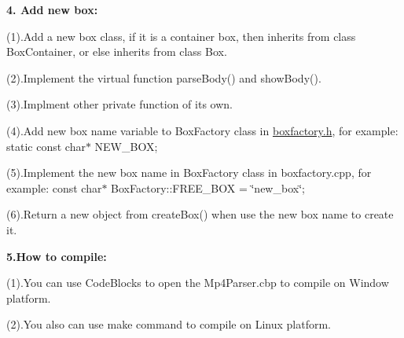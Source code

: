 \begin{DoxyCode}{0}
\DoxyCodeLine{\{}
\DoxyCodeLine{    }
\DoxyCodeLine{    }
\DoxyCodeLine{    }
\DoxyCodeLine{}
\DoxyCodeLine{    }
\DoxyCodeLine{\}}
\end{DoxyCode}


{\bfseries{4. Add new box\+:}}

(1).Add a new box class, if it is a container box, then inherits from class Box\+Container, or else inherits from class Box.

(2).Implement the virtual function parse\+Body() and show\+Body().

(3).Implment other private function of its own.

(4).Add new box name variable to Box\+Factory class in \mbox{\hyperlink{boxfactory_8h_source}{boxfactory.\+h}}, for example\+: static const char$\ast$ N\+E\+W\+\_\+\+B\+OX;

(5).Implement the new box name in Box\+Factory class in boxfactory.\+cpp, for example\+: const char$\ast$ Box\+Factory\+::\+F\+R\+E\+E\+\_\+\+B\+OX = \char`\"{}new\+\_\+box\char`\"{};

(6).Return a new object from create\+Box() when use the new box name to create it.

{\bfseries{5.\+How to compile\+:}}

(1).You can use Code\+Blocks to open the Mp4\+Parser.\+cbp to compile on Window platform.

(2).You also can use make command to compile on Linux platform. 